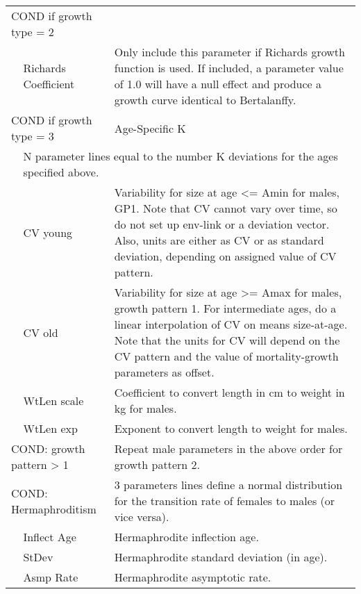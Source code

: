 \begin{longtable}{p{1cm} p{2.25cm} p{10cm}}
	\multicolumn{2}{l}{COND if growth type = 2} & \Tstrut\\
	& Richards Coefficient & Only include this parameter if Richards growth function is used. If included, a parameter value of 1.0 will have a null effect and produce a growth curve identical to Bertalanffy. \\
	\multicolumn{2}{l}{COND if growth type = 3} & Age-Specific K \\
	& \multicolumn{2}{l}{N parameter lines equal to the number K deviations for the ages specified above.} \Bstrut\\
	\hline

	\Tstrut & CV young & Variability for size at age <= Amin for males, GP1. Note that CV cannot vary over time, so do not set up env-link or a deviation vector. Also, units are either as CV or as standard deviation, depending on assigned value of CV pattern. \\
	& CV old & Variability for size at age >= Amax for males, growth pattern 1. For intermediate ages, do a linear interpolation of CV on means size-at-age. Note that the units for CV will depend on the CV pattern and the value of mortality-growth parameters as offset. \\
	\hline

	\Tstrut & WtLen scale & Coefficient to convert length in cm to weight in kg for males. \\
	& WtLen exp & Exponent to convert length to weight for males. \Bstrut\\

	\multicolumn{2}{l}{COND: growth pattern > 1} \Tstrut & Repeat male parameters in the above order for growth pattern 2. \\
	\hline

	\multicolumn{2}{l}{COND: Hermaphroditism} \Tstrut & 3 parameters lines define a normal distribution for the transition rate of females to males (or vice versa). \\
	& Inflect Age & Hermaphrodite inflection age. \\
	& StDev & Hermaphrodite standard deviation (in age). \\
	& Asmp Rate & Hermaphrodite asymptotic rate. \Bstrut\\
	\hline


\end{longtable}

